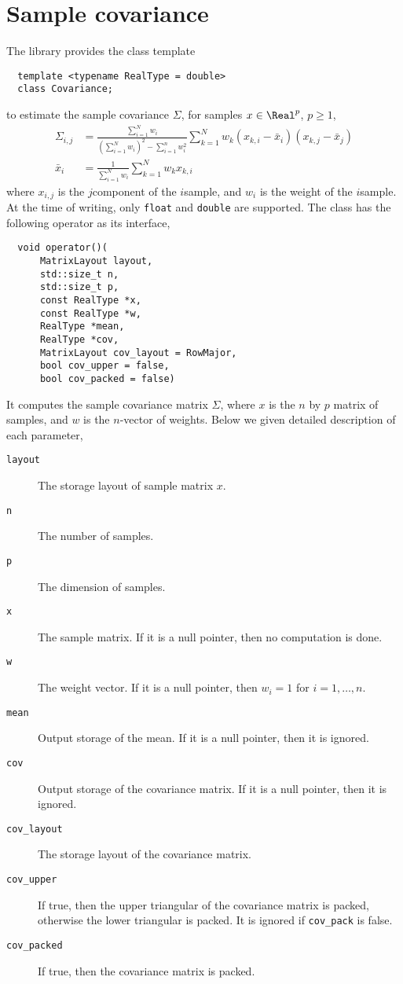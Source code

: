 \section{Sample covariance}
\label{sec:Sample covariance}

The library provides the class template
\begin{Verbatim}
  template <typename RealType = double>
  class Covariance;
\end{Verbatim}
to estimate the sample covariance $\Sigma$, for samples $x\in\Real^p$, $p\ge1$,
\begin{align*}
  \Sigma_{i,j} &= \frac{\sum_{i=1}^N w_i}
  {(\sum_{i=1}^N w_i)^2 - \sum_{i=1}^n w_i^2}
  \sum_{k=1}^N w_k (x_{k,i} - \bar{x}_i)(x_{k,j} - \bar{x}_j) \\
  \bar{x}_i &= \frac{1}{\sum_{i=1}^N w_i}\sum_{k=1}^N w_k x_{k,i}
\end{align*}
where $x_{i,j}$ is the $j$\ith component of the $i$\ith sample, and $w_i$ is
the weight of the $i$\ith sample. At the time of writing, only \verb|float| and
\verb|double| are supported. The class has the following operator as its
interface,
\begin{Verbatim}
  void operator()(
      MatrixLayout layout,
      std::size_t n,
      std::size_t p,
      const RealType *x,
      const RealType *w,
      RealType *mean,
      RealType *cov,
      MatrixLayout cov_layout = RowMajor,
      bool cov_upper = false,
      bool cov_packed = false)
\end{Verbatim}
It computes the sample covariance matrix $\Sigma$,
where $x$ is the $n$ by $p$ matrix of samples, and $w$ is the $n$-vector of
weights. Below we given detailed description of each parameter,
\begin{description}
  \item[\texttt{layout}] The storage layout of sample matrix $x$.
  \item[\texttt{n}] The number of samples.
  \item[\texttt{p}] The dimension of samples.
  \item[\texttt{x}] The sample matrix. If it is a null pointer, then no
    computation is done.
  \item[\texttt{w}] The weight vector. If it is a null pointer, then $w_i = 1$
    for $i = 1,\dots,n$.
  \item[\texttt{mean}] Output storage of the mean. If it is a null pointer,
    then it is ignored.
  \item[\texttt{cov}] Output storage of the covariance matrix. If it is a null
    pointer, then it is ignored.
  \item[\texttt{cov\_layout}] The storage layout of the covariance matrix.
  \item[\texttt{cov\_upper}] If true, then the upper triangular of the
    covariance matrix is packed, otherwise the lower triangular is packed.
    It is ignored if \verb|cov_pack| is false.
  \item[\texttt{cov\_packed}] If true, then the covariance matrix is
    packed.
\end{description}
